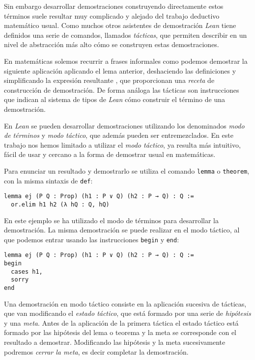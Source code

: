 Sin embargo desarrollar demostraciones construyendo directamente estos términos
suele resultar muy complicado y alejado del trabajo deductivo matemático usual.
Como muchos otros asistentes de demostración \textit{Lean} tiene definidos una
serie de comandos, llamados \textit{tácticas}, que permiten describir en un
nivel de abstracción más alto cómo se construyen estas demostraciones.

En matemáticas solemos recurrir a frases informales como \guillemotleft
podemos demostrar la siguiente aplicación aplicando el lema anterior,
deshaciendo las definiciones y simplificando la expresión resultante
\guillemotright, que proporcionan una \textit{receta} de construcción de
demostración. De forma análoga las tácticas son instrucciones que indican al
sistema de tipos de \textit{Lean} cómo construir el término de una demostración.

En \textit{Lean} se pueden desarrollar demostraciones utilizando los denominados
\textit{modo de términos} y \textit{modo táctico}, que además pueden ser
entremezclados. En este trabajo nos hemos limitado a utilizar el  \textit{modo
	táctico}, ya resulta más intuitivo, fácil de usar y cercano a la forma de
demostrar usual en matemáticas.

Para enunciar un resultado y demostrarlo se utiliza el comando \lstinline{lemma}
o \lstinline{theorem}, con la misma sintaxis de \lstinline{def}:

\begin{lstlisting}
lemma ej (P Q : Prop) (h1 : P ∨ Q) (h2 : P → Q) : Q :=
  or.elim h1 h2 (λ hQ : Q, hQ)
\end{lstlisting}

En este ejemplo se ha utilizado el modo de términos para desarrollar la
demostración. La misma demostración se puede realizar en el modo táctico, al que
podemos entrar usando las instrucciones \lstinline{begin} y \lstinline{end}:

\begin{lstlisting}
lemma ej (P Q : Prop) (h1 : P ∨ Q) (h2 : P → Q) : Q :=
begin
  cases h1,
  sorry
end
\end{lstlisting}

Una demostración en modo táctico consiste en la aplicación sucesiva de tácticas,
que van modificando el \textit{estado táctico}, que está formado por una serie
de \textit{hipótesis} y una \textit{meta}. Antes de la aplicación de la primera
táctica el estado táctico está formado por las hipótesis del lema o teorema y la
meta se corresponde con el resultado a demostrar. Modificando las hipótesis y la
meta sucesivamente podremos \textit{cerrar la meta}, es decir completar la
demostración.

